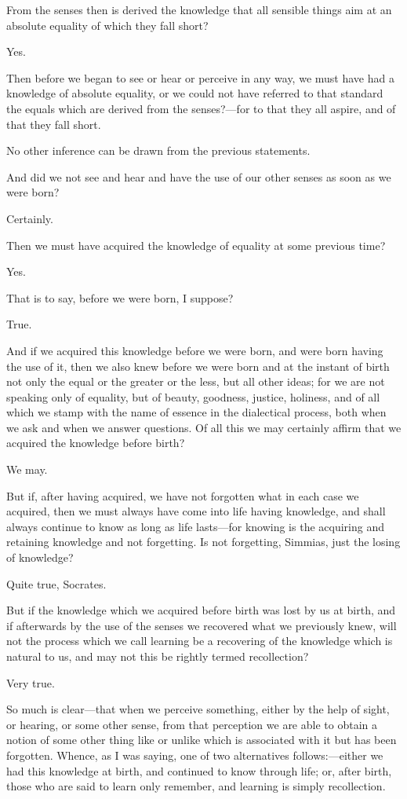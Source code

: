 From the senses then is derived the knowledge that all sensible things aim
at an absolute equality of which they fall short?

Yes.

Then before we began to see or hear or perceive in any way, we must have
had a knowledge of absolute equality, or we could not have referred to
that standard the equals which are derived from the senses?—for to
that they all aspire, and of that they fall short.

No other inference can be drawn from the previous statements.

And did we not see and hear and have the use of our other senses as soon
as we were born?

Certainly.

Then we must have acquired the knowledge of equality at some previous
time?

Yes.

That is to say, before we were born, I suppose?

True.

And if we acquired this knowledge before we were born, and were born
having the use of it, then we also knew before we were born and at the
instant of birth not only the equal or the greater or the less, but all
other ideas; for we are not speaking only of equality, but of beauty,
goodness, justice, holiness, and of all which we stamp with the name of
essence in the dialectical process, both when we ask and when we answer
questions. Of all this we may certainly affirm that we acquired the
knowledge before birth?

We may.

But if, after having acquired, we have not forgotten what in each case we
acquired, then we must always have come into life having knowledge, and
shall always continue to know as long as life lasts—for knowing is
the acquiring and retaining knowledge and not forgetting. Is not
forgetting, Simmias, just the losing of knowledge?

Quite true, Socrates.

But if the knowledge which we acquired before birth was lost by us at
birth, and if afterwards by the use of the senses we recovered what we
previously knew, will not the process which we call learning be a
recovering of the knowledge which is natural to us, and may not this be
rightly termed recollection?

Very true.

So much is clear—that when we perceive something, either by the help
of sight, or hearing, or some other sense, from that perception we are
able to obtain a notion of some other thing like or unlike which is
associated with it but has been forgotten. Whence, as I was saying, one of
two alternatives follows:—either we had this knowledge at birth, and
continued to know through life; or, after birth, those who are said to
learn only remember, and learning is simply recollection.

